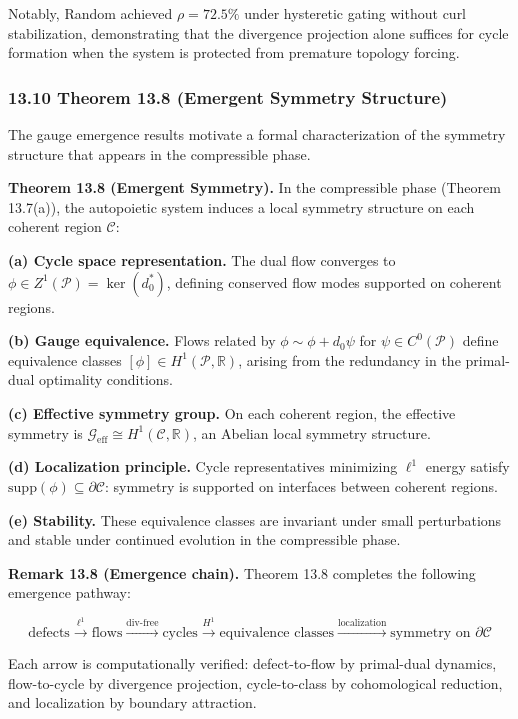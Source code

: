 \documentclass[
]{article}
\begin{document}
Notably, Random achieved \(\rho = 72.5\%\) under hysteretic gating
without curl stabilization, demonstrating that the divergence projection
alone suffices for cycle formation when the system is protected from
premature topology forcing.

\subsubsection{13.10 Theorem 13.8 (Emergent Symmetry
Structure)}\label{theorem-13.8-emergent-symmetry-structure}

The gauge emergence results motivate a formal characterization of the
symmetry structure that appears in the compressible phase.

\textbf{Theorem 13.8 (Emergent Symmetry).} In the compressible phase
(Theorem 13.7(a)), the autopoietic system induces a local symmetry
structure on each coherent region \(\mathcal{C}\):

\textbf{(a) Cycle space representation.} The dual flow converges to
\(\phi \in Z^1(\mathcal{P}) = \ker(d_0^*)\), defining conserved flow
modes supported on coherent regions.

\textbf{(b) Gauge equivalence.} Flows related by
\(\phi \sim \phi + d_0\psi\) for \(\psi \in C^0(\mathcal{P})\) define
equivalence classes \([\phi] \in H^1(\mathcal{P}, \mathbb{R})\), arising
from the redundancy in the primal-dual optimality conditions.

\textbf{(c) Effective symmetry group.} On each coherent region, the
effective symmetry is
\(\mathcal{G}_{\mathrm{eff}} \cong H^1(\mathcal{C}, \mathbb{R})\), an
Abelian local symmetry structure.

\textbf{(d) Localization principle.} Cycle representatives minimizing
\(\ell^1\) energy satisfy
\(\mathrm{supp}(\phi) \subseteq \partial\mathcal{C}\): symmetry is
supported on interfaces between coherent regions.

\textbf{(e) Stability.} These equivalence classes are invariant under
small perturbations and stable under continued evolution in the
compressible phase.

\textbf{Remark 13.8 (Emergence chain).} Theorem 13.8 completes the
following emergence pathway:

\[\text{defects} \xrightarrow{\ell^1} \text{flows} \xrightarrow{\mathrm{div\text{-}free}} \text{cycles} \xrightarrow{H^1} \text{equivalence classes} \xrightarrow{\text{localization}} \text{symmetry on } \partial\mathcal{C}\]

Each arrow is computationally verified: defect-to-flow by primal-dual
dynamics, flow-to-cycle by divergence projection, cycle-to-class by
cohomological reduction, and localization by boundary attraction.
\end{document}
